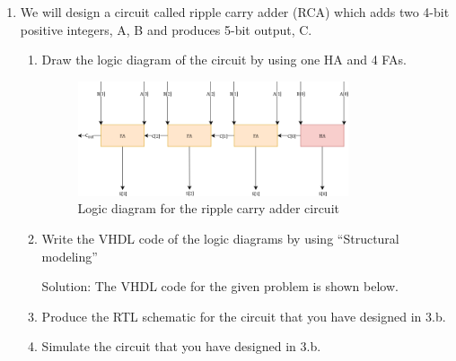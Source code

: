 \documentclass[table]{article}
\begin{document}
\begin{enumerate}
    \item We will design a circuit called ripple carry adder (RCA) which adds two 4-bit positive
    integers, A, B and produces 5-bit output, C.



    \begin{enumerate}[label=(\alph*)]
        \item Draw the logic diagram of the circuit by using one HA and 4 FAs.
    
        
        \begin{figure}[H]

            \centering
            \includegraphics[width=0.8\textwidth]{rca.png}
            \caption{Logic diagram for the ripple carry adder circuit}
            \label{fig:rca}

                
            
        \end{figure}



        \item Write the VHDL code of the logic diagrams by using “Structural modeling”

        Solution: The VHDL code for the given problem is shown below.

        \begin{center} %
            \lstset{
          caption= ripple\_carry\_adder.vhd, 
          basicstyle=\footnotesize, frame=tb,
          xleftmargin=.2\textwidth, xrightmargin=.2\textwidth
        }
            
        \end{center}

        \item Produce the RTL schematic for the circuit that you have designed in 3.b.
        \item Simulate the circuit that you have designed in 3.b.
    \end{enumerate}





    
\end{enumerate}
\end{document}
